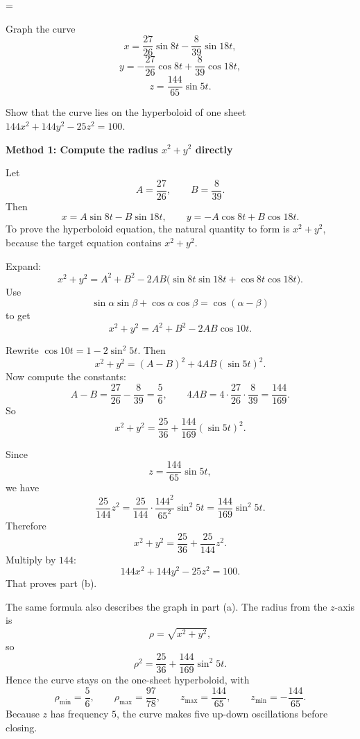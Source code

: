 \documentclass[a4paper,12pt,twocolumn]{article}
\newlength{\problemnumberwidth}
\newenvironment{solutionbox}{\begin{framed}}{\end{framed}}
\newcommand{\problem}[3]{%
  \Needspace{10\baselineskip}%
  \phantomsection\label{#1}%
  \par\vspace{0.8em}%
  \noindent
  \hangindent=\problemnumberwidth
  \hangafter=1
  \makebox[\problemnumberwidth][l]{\textbf{#2.}}#3\par
}
\begin{document}
\problem{prob:13-1-59}{59}{%
\begin{subparts}
\item Graph the curve
\[
x=\frac{27}{26}\sin 8t-\frac{8}{39}\sin 18t,
\]
\[
y=-\frac{27}{26}\cos 8t+\frac{8}{39}\cos 18t,
\]
\[
z=\frac{144}{65}\sin 5t.
\]
\item Show that the curve lies on the hyperboloid of one sheet \(144x^2+144y^2-25z^2=100\).
\end{subparts}}

\begin{solutionbox}
\textbf{Method 1: Compute the radius \(x^2+y^2\) directly}

\begin{steps}
\item Let
\[
A=\frac{27}{26},\qquad B=\frac{8}{39}.
\]
Then
\[
x=A\sin 8t-B\sin 18t,\qquad
y=-A\cos 8t+B\cos 18t.
\]
To prove the hyperboloid equation, the natural quantity to form is \(x^2+y^2\), because the target equation contains \(x^2+y^2\).

\item Expand:
\[
x^2+y^2=A^2+B^2-2AB\bigl(\sin 8t\sin 18t+\cos 8t\cos 18t\bigr).
\]
Use
\[
\sin \alpha\sin\beta+\cos\alpha\cos\beta=\cos(\alpha-\beta)
\]
to get
\[
x^2+y^2=A^2+B^2-2AB\cos 10t.
\]

\item Rewrite \(\cos 10t=1-2\sin^2 5t\). Then
\[
x^2+y^2={(A-B)}^2+4AB{(\sin 5t)}^2.
\]
Now compute the constants:
\[
A-B=\frac{27}{26}-\frac{8}{39}=\frac56,
\qquad
4AB=4\cdot \frac{27}{26}\cdot\frac{8}{39}=\frac{144}{169}.
\]
So
\[
x^2+y^2=\frac{25}{36}+\frac{144}{169}{(\sin 5t)}^2.
\]

\item Since
\[
z=\frac{144}{65}\sin 5t,
\]
we have
\[
\frac{25}{144}z^2
=\frac{25}{144}\cdot \frac{144^2}{65^2}\sin^2 5t
=\frac{144}{169}\sin^2 5t.
\]
Therefore
\[
x^2+y^2=\frac{25}{36}+\frac{25}{144}z^2.
\]
Multiply by \(144\):
\[
144x^2+144y^2-25z^2=100.
\]
That proves part (b).

\item The same formula also describes the graph in part (a). The radius from the \(z\)-axis is
\[
\rho=\sqrt{x^2+y^2},
\]
so
\[
\rho^2=\frac{25}{36}+\frac{144}{169}\sin^2 5t.
\]
Hence the curve stays on the one-sheet hyperboloid, with
\[
\rho_{\min}=\frac56,\qquad
\rho_{\max}=\frac{97}{78},
\qquad
z_{\max}=\frac{144}{65},
\qquad
z_{\min}=-\frac{144}{65}.
\]
Because \(z\) has frequency \(5\), the curve makes five up-down oscillations before closing.
\end{steps}
\end{solutionbox}
\end{document}
